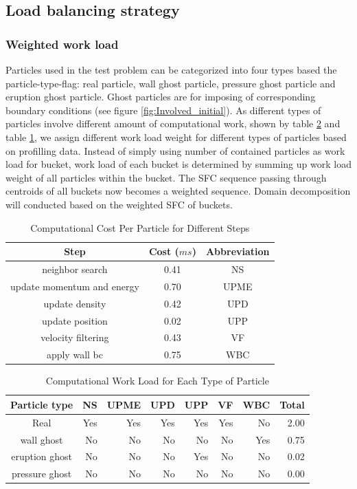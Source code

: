 \documentclass[conference,compsoc]{IEEEtran}
\begin{document}
\subsection{Load balancing strategy}
\subsubsection{Weighted work load}
Particles used in the test problem can be categorized into four types based the particle-type-flag: real particle, wall ghost particle, pressure ghost particle and eruption ghost particle. Ghost particles are for imposing of corresponding boundary conditions (see figure \ref{fig:Involved_initial}). As different types of particles involve different amount of computational work, shown by table \ref{tab:Computational_cost_particles} and table \ref{tab:Computational_cost_steps}, we assign different work load weight for different types of particles based on profilling data. Instead of simply using number of contained particles as work load for bucket, work load of each bucket is determined by summing up work load weight of all particles within the bucket. The SFC sequence passing through centroids of all buckets now becomes a weighted sequence. Domain decomposition will conducted based on the weighted SFC of buckets.\\
\begin{table}[t!]
  \renewcommand{\arraystretch}{1.2}
  \centering
  \caption{Computational Cost Per Particle for Different Steps}
  \label{tab:Computational_cost_steps}
  \begin{tabular}{|c|c|c|}
    \hline
    Step & Cost ($ms$) & Abbreviation\\
    \hline
    neighbor search & 0.41 & NS\\
    \hline
    update momentum and energy & 0.70 & UPME\\
    \hline
    update density & 0.42 & UPD\\
    \hline
    update position & 0.02 & UPP\\
    \hline
    velocity filtering& 0.43 & VF\\
    \hline
    apply wall bc & 0.75 & WBC\\
    \hline
  \end{tabular}
\end{table}
\begin{table}[t!]
  \renewcommand{\arraystretch}{1.2}
  \centering
  \caption{Computational Work Load for Each Type of Particle}
  \label{tab:Computational_cost_particles}
  \begin{tabular}{|c|r|r|r|r|r|r|r|}
    \hline
    Particle type & NS & UPME & UPD & UPP &VF &WBC &Total\\
    \hline
    Real & Yes & Yes & Yes & Yes & Yes & No & 2.00\\
    \hline
    wall ghost & No & No & No & No & No & Yes &0.75\\
    \hline
    eruption ghost & No & No & No & Yes & No & No & 0.02\\
    \hline
    pressure ghost & No & No & No & No & No & No & 0.00\\
    \hline
  \end{tabular}
\end{table}
\end{document}
